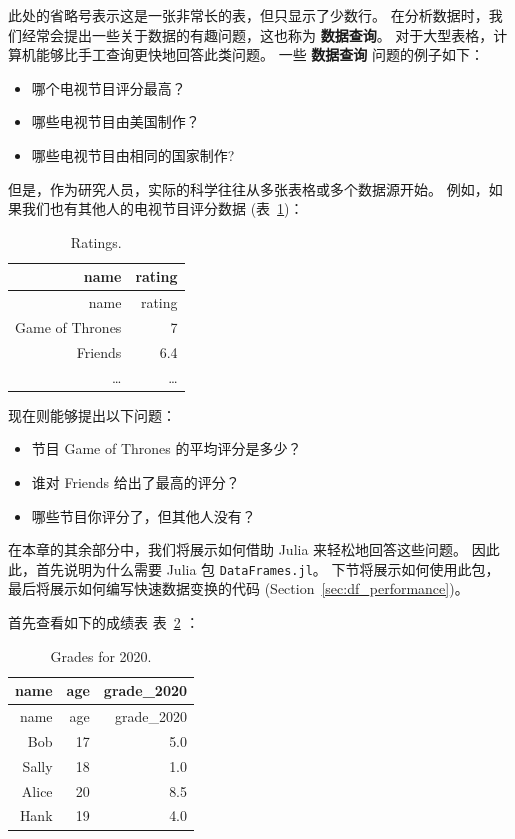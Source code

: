 \documentclass[
  notoc %
]{tufte-book}
\providecommand{\tightlist}{%
  \setlength{\itemsep}{0pt}\setlength{\parskip}{0pt}
}
\newcommand{\passthrough}[1]{#1}
\begin{document}
此处的省略号表示这是一张非常长的表，但只显示了少数行。
在分析数据时，我们经常会提出一些关于数据的有趣问题，这也称为
\textbf{数据查询}。
对于大型表格，计算机能够比手工查询更快地回答此类问题。 一些
\textbf{数据查询} 问题的例子如下：

\begin{itemize}
\tightlist
\item
  哪个电视节目评分最高？
\item
  哪些电视节目由美国制作？
\item
  哪些电视节目由相同的国家制作?
\end{itemize}

但是，作为研究人员，实际的科学往往从多张表格或多个数据源开始。
例如，如果我们也有其他人的电视节目评分数据 (表~\ref{tbl:ratings})：

\hypertarget{tbl:ratings}{}
\begin{longtable}[]{@{}rr@{}}
\caption{\label{tbl:ratings}Ratings.}\tabularnewline
\toprule
name & rating \\
\midrule
\endfirsthead
\toprule
name & rating \\
\midrule
\endhead
Game of Thrones & 7 \\
Friends & 6.4 \\
\ldots{} & \ldots{} \\
\bottomrule
\end{longtable}

现在则能够提出以下问题：

\begin{itemize}
\tightlist
\item
  节目 Game of Thrones 的平均评分是多少？
\item
  谁对 Friends 给出了最高的评分？
\item
  哪些节目你评分了，但其他人没有？
\end{itemize}

在本章的其余部分中，我们将展示如何借助 Julia 来轻松地回答这些问题。
因此此，首先说明为什么需要 Julia 包
\passthrough{\lstinline!DataFrames.jl!}。
下节将展示如何使用此包，最后将展示如何编写快速数据变换的代码
(Section~\ref{sec:df_performance})。

首先查看如下的成绩表 表~\ref{tbl:grades_for_2020} ：

\hypertarget{tbl:grades_for_2020}{}
\begin{longtable}[]{@{}rrr@{}}
\caption{\label{tbl:grades_for_2020}Grades for 2020.}\tabularnewline
\toprule
name & age & grade\_2020 \\
\midrule
\endfirsthead
\toprule
name & age & grade\_2020 \\
\midrule
\endhead
Bob & 17 & 5.0 \\
Sally & 18 & 1.0 \\
Alice & 20 & 8.5 \\
Hank & 19 & 4.0 \\
\bottomrule
\end{longtable}
\end{document}
